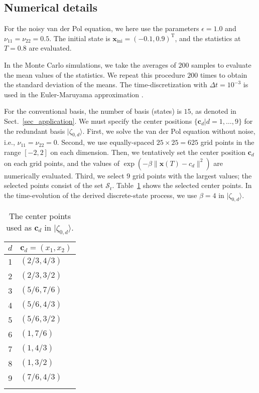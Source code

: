 \documentclass[sn-mathphys,Numbered]{sn-jnl}%
\theoremstyle{thmstyleone}%
\theoremstyle{thmstyletwo}%
\theoremstyle{thmstylethree}%
\begin{document}
\begin{appendices}



\section{Numerical details}

For the noisy van der Pol equation, we here use the parameters $\epsilon = 1.0$ and $\nu_{11} = \nu_{22} = 0.5$. The initial state is $\bm{x}_\mathrm{ini} = (-0.1, 0.9)^\mathrm{T}$, and the statistics at $T=0.8$ are evaluated.

In the Monte Carlo simulations, we take the averages of $200$ samples to evaluate the mean values of the statistics. We repeat this procedure $200$ times to obtain the standard deviation of the means. The time-discretization with $\Delta t = 10^{-3}$ is used in the Euler-Maruyama approximation \cite{Kloeden1992}. 

For the conventional basis, the number of basis (states) is $15$, as denoted in Sect.~\ref{sec_application}. We must specify the center positions $\{\bm{c}_d | d = 1, \dots, 9\}$ for the redundant basis $| \zeta_{0,d}\rangle$. First, we solve the van der Pol equation without noise, i.e., $\nu_{11} = \nu_{22} = 0$. Second, we use equally-spaced $25\times 25 = 625$ grid points in the range $[-2,2]$ on each dimension. Then, we tentatively set the center position $\bm{c}_d$ on each grid points, and the values of $\exp(-\beta \|\bm{x}(T)-{c}_d\|^2)$ are numerically evaluated. Third, we select $9$ grid points with the largest values; the selected points consist of the set $\mathcal{S}_\mathrm{r}$. Table~\ref{table_centers} shows the selected center points. In the time-evolution of the derived discrete-state process, we use $\beta = 4$ in $| \zeta_{0,d}\rangle$. 


\begin{table}[tbp] 
\caption{The center points used as $\bm{c}_d$ in $| \zeta_{0,d}\rangle$.}
\label{table_centers}
\begin{tabular}{cl}
\toprule
$d$ & $\bm{c}_d = (x_1, x_2)$ \\
\midrule
1 & $(2/3, 4/3)$\\
2 & $(2/3, 3/2)$\\
3 & $(5/6, 7/6)$\\
4 & $(5/6, 4/3)$\\
5 & $(5/6, 3/2)$\\
6 & $(1, 7/6)$\\
7 & $(1, 4/3)$\\
8 & $(1, 3/2)$\\
9 & $(7/6, 4/3)$ \\ 
\botrule
\end{tabular}
\end{table}


\end{appendices}
\end{document}
